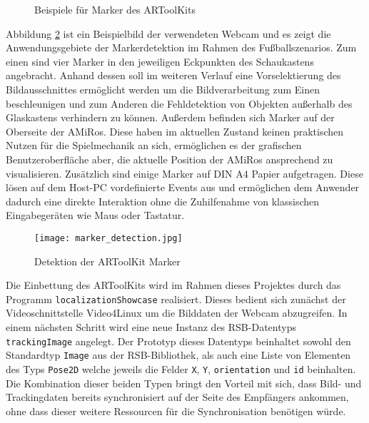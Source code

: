\begin{figure}
	\begin{center}
		\caption{Beispiele für Marker des ARToolKits}
		\label{fig:art_marker}
	\end{center}
\end{figure}

Abbildung \ref{fig:marker_detection} ist ein Beispielbild der verwendeten Webcam und es zeigt die Anwendungsgebiete der Markerdetektion im Rahmen des Fußballszenarios. Zum einen sind vier Marker in den jeweiligen Eckpunkten des Schaukastens angebracht. Anhand dessen soll im weiteren Verlauf eine Vorselektierung des Bildausschnittes ermöglicht werden um die Bildverarbeitung zum Einen beschleunigen und zum Anderen die Fehldetektion von Objekten außerhalb des Glaskastens verhindern zu können. Außerdem befinden sich Marker auf der Oberseite der AMiRos. Diese haben im aktuellen Zustand keinen praktischen Nutzen für die Spielmechanik an sich, ermöglichen es der grafischen Benutzeroberfläche aber, die aktuelle Position der AMiRos ansprechend zu visualisieren. Zusätzlich sind einige Marker auf DIN A4 Papier aufgetragen. Diese lösen auf dem Host-PC vordefinierte Events aus und ermöglichen dem Anwender dadurch eine direkte Interaktion ohne die Zuhilfenahme von klassischen Eingabegeräten wie Maus oder Tastatur.

\begin{figure}
	\begin{center}
		\texttt{[image: marker\_detection.jpg]} 	
		\caption{Detektion der ARToolKit Marker}
		\label{fig:marker_detection}
	\end{center}
\end{figure}

Die Einbettung des ARToolKits wird im Rahmen dieses Projektes durch das Programm \texttt{localizationShowcase} realisiert. Dieses bedient sich zunächst der Videoschnittstelle Video4Linux um die Bilddaten der Webcam abzugreifen. In einem nächsten Schritt wird eine neue Instanz des RSB-Datentyps \texttt{trackingImage} angelegt. Der Prototyp dieses Datentyps beinhaltet sowohl den Standardtyp \texttt{Image} aus der RSB-Bibliothek, als auch eine Liste von Elementen des Typs \texttt{Pose2D} welche jeweils die Felder \texttt{X}, \texttt{Y}, \texttt{orientation} und \texttt{id} beinhalten. Die Kombination dieser beiden Typen bringt den Vorteil mit sich, dass Bild- und Trackingdaten bereits synchronisiert auf der Seite des Empfängers ankommen, ohne dass dieser weitere Ressourcen für die Synchronisation benötigen würde.

